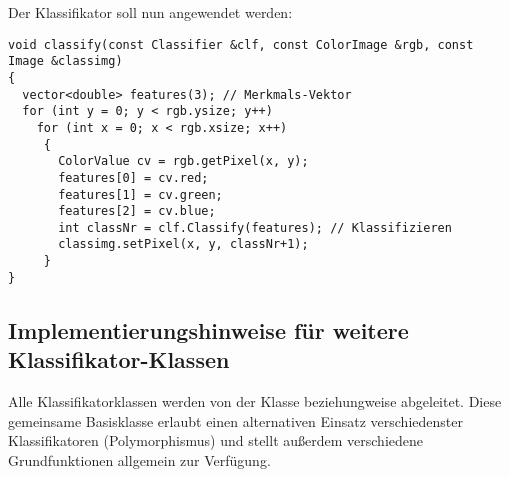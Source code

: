 Der Klassifikator soll nun angewendet werden:
\begprogr\begin{verbatim}
void classify(const Classifier &clf, const ColorImage &rgb, const Image &classimg)
{
  vector<double> features(3); // Merkmals-Vektor
  for (int y = 0; y < rgb.ysize; y++)
    for (int x = 0; x < rgb.xsize; x++)
     {
       ColorValue cv = rgb.getPixel(x, y);
       features[0] = cv.red;
       features[1] = cv.green;
       features[2] = cv.blue;
       int classNr = clf.Classify(features); // Klassifizieren
       classimg.setPixel(x, y, classNr+1);
     }
}
\end{verbatim}\endprogr

\subsection{Implementierungshinweise für weitere Klassifikator-Klassen}

Alle Klassifikatorklassen werden von der Klasse  
beziehungweise
 abgeleitet.
Diese gemeinsame Basisklasse  erlaubt einen alternativen 
Einsatz verschiedenster Klassifikatoren (Polymorphismus) und stellt 
außerdem verschiedene Grundfunktionen allgemein zur Verfügung.

